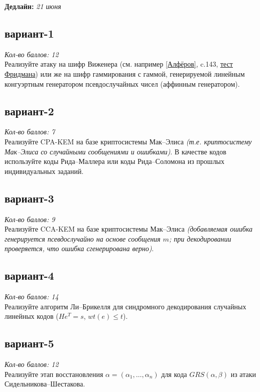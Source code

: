 \documentclass[12pt,letterpaper]{article}
\begin{document}
\textbf{Дедлайн:} \emph{21 июня}

\subsection*{вариант-1}
\textit{Кол-во баллов: 12}\\
Реализуйте атаку на шифр Виженера (см. например \href{https://cloudflare-ipfs.com/ipfs/bafykbzacedx7ntkiv2c3so3tg7bmdvln7kucgup7hho46wmyl3xbclp7x6yty?filename=Alferov.djvu}{[Алфёров]}, c.143, \href{https://www.nku.edu/~christensen/1402%20Friedman%20test%202.pdf}{тест Фридмана}) или же на шифр гаммирования с гаммой, генерируемой линейным конгуэртным генератором псевдослучайных чисел (аффинным генератором).

\subsection*{вариант-2}
\textit{Кол-во баллов: 7}\\
Реализуйте CPA-KEM на базе криптосистемы Мак--Элиса \emph{(т.е. криптосистему Мак--Элиса со случайными сообщениями и ошибками)}. В качестве кодов используйте коды Рида--Маллера или коды Рида--Соломона из прошлых индивидуальных заданий.

\subsection*{вариант-3}
\textit{Кол-во баллов: 9}\\
Реализуйте CCA-KEM на базе криптосистемы Мак--Элиса \emph{(добавляемая ошибка генерируется псевдослучайно на основе сообщения $m$; при декодировании проверяется, что ошибка сгенерирована верно)}. 

\subsection*{вариант-4}
\textit{Кол-во баллов: 14}\\
Реализуйте алгоритм Ли--Брикелля для синдромного декодирования случайных линейных кодов ($H e^T = s$, $wt(e) \leq t$).

\subsection*{вариант-5}
\textit{Кол-во баллов: 12}\\
Реализуйте этап восстановления $\alpha = (\alpha_1, \dots, \alpha_n)$ для кода $GRS(\alpha, \beta)$ из атаки Сидельникова--Шестакова.
\end{document}
